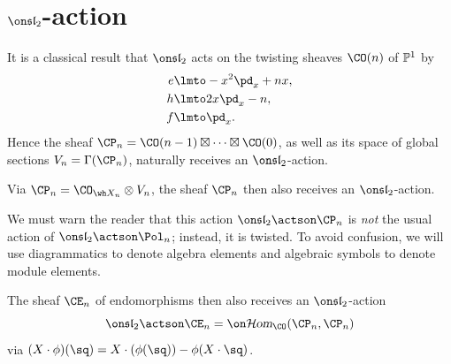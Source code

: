 \documentclass[11pt,reqno]{amsart}
\begin{document}
\section{$\sl_2$-action}\label{sec:1color sl2}
It is a classical result that $\sl_2$ acts on the twisting sheaves $\CO(n)$ of $\mathbb P^1$ by
\begin{align*}
    e&\lmto -x^2\pd_x+nx,\\
    h&\lmto 2x\pd_x-n,\\
    f&\lmto \pd_x.
\end{align*}
Hence the sheaf $\CP_n=\CO(n-1)\boxtimes\cdots\boxtimes\CO(0)$, as well as its space of global sections $V_n=\Gamma(\CP_n)$, naturally receives an $\sl_2$-action. 

Via $\CP_n=\CO_{\wh X_n}\otimes V_n$, the sheaf $\CP_n$ then also receives an $\sl_2$-action. 
\begin{remark}
    We must warn the reader that this action $\sl_2\actson\CP_n$ is \textit{not} the usual action of $\sl_2\actson \Pol_n$; instead, it is twisted. To avoid confusion, we will use diagrammatics to denote algebra elements and algebraic symbols to denote module elements.
\end{remark}

The sheaf $\CE_n$ of endomorphisms then also receives an $\sl_2$-action 
    \[\sl_2\actson \CE_n=\shom_\CO(\CP_n,\CP_n)\] 
via $(X\cdot \phi)(\sq)=X\cdot (\phi(\sq))-\phi(X\cdot \sq)$. 
\end{document}
